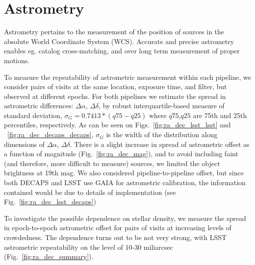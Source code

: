 \documentclass[DM,lsstdraft,toc,usenatbib]{lsstdoc}
\begin{document}


\section{Astrometry}
\label{sec:astrometry}
Astrometry pertains to the measurement of the position of sources in the absolute World Coordinate System (WCS). Accurate and precise astrometry enables eg. catalog cross-matching, and over long term measurement of proper motions.

To measure the repeatability of astrometric measurement within each pipeline, we consider pairs of visits at the same location, exposure time, and filter, but observed at different epochs. For both pipelines we estimate the spread in astrometric differences:  $\Delta \alpha$, $\Delta \delta$, by robust interquartile-based measure of standard deviation, $\sigma_{G} =  0.7413 * (q75 - q25)$ where $q75$,$q25$ are 75th and 25th percentiles, respectively. 
As can be seen on Figs.~\ref{fig:ra_dec_lsst_lsst} and ~\ref{fig:ra_dec_decaps_decaps}, $\sigma_{G}$ is the width of the distribution along dimensions of $\Delta \alpha$, $\Delta \delta$. There is a slight increase in spread of astrometric offset as a function of magnitude (Fig.~\ref{fig:ra_dec_mag}), and to avoid including faint (and therefore, more difficult to measure) sources, we limited the object brightness at 19th mag.  We also considered pipeline-to-pipeline offset, but since both DECAPS and LSST use GAIA for astrometric calibration, the information contained would be due to details of implementation (see Fig.~\ref{fig:ra_dec_lsst_decaps})

To investigate the possible dependence on stellar density, we measure the spread  in epoch-to-epoch astrometric offset for pairs of visits at increasing levels of crowdedness. The dependence turns out to be not very strong, with LSST astrometric repeatability on the level of 10-30 miliarcsec (Fig.~\ref{fig:ra_dec_summary}). 
\end{document}
